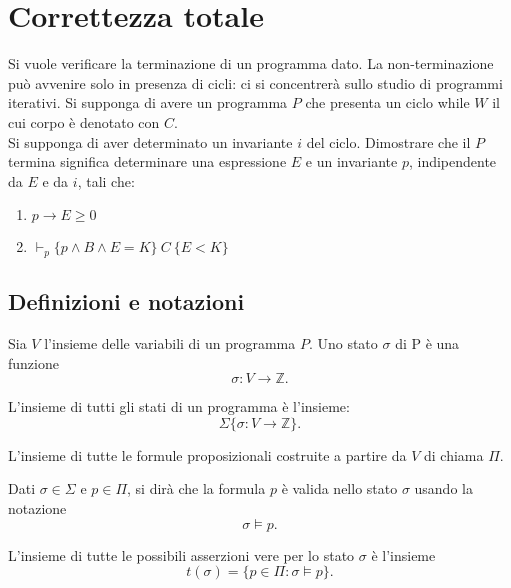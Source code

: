 \begin{prooftree}
\end{prooftree}
\newpage
\section{Correttezza totale}
Si vuole verificare la terminazione di un programma dato. La non-terminazione pu\`o avvenire solo in presenza di cicli: ci si concentrer\`a sullo studio di programmi iterativi.
Si supponga di avere un programma $P$ che presenta un ciclo while $W$ il cui corpo \`e denotato con $C$. \\
Si supponga di aver determinato un invariante $i$ del ciclo. Dimostrare che il $P$ termina significa determinare una espressione $E$ e un invariante $p$, indipendente da $E$ e da $i$, tali che:
\begin{enumerate}
	\item $ p \rightarrow E \geq 0$
	\item $ \vdash_p \{ p \land B \land E=K  \}\ C\ \{E < K\}   $
\end{enumerate}

\subsection{Definizioni e notazioni}
\begin{deff}
	Sia $V$ l'insieme delle variabili di un programma $P$. Uno stato $\sigma$ di P \`e una funzione $$\sigma: V \rightarrow \mathbb{Z}.$$
\end{deff}

\begin{deff}
	L'insieme di tutti gli stati di un programma \`e l'insieme: $$\Sigma \{\sigma:V\rightarrow \mathbb{Z}\}.$$
\end{deff}

\begin{deff}
	L'insieme di tutte le formule proposizionali costruite a partire da $V$ di chiama $\Pi$.
\end{deff}

Dati $\sigma \in \Sigma$ e $ p \in \Pi$, si dir\`a che la formula $p$ \`e valida nello stato $\sigma$ usando la notazione $$\sigma \models p.$$

\begin{deff}
	L'insieme di tutte le possibili asserzioni vere per lo stato $\sigma$ \`e l'insieme $$t(\sigma)=\{p \in \Pi : \sigma \models p\}.$$
\end{deff}

